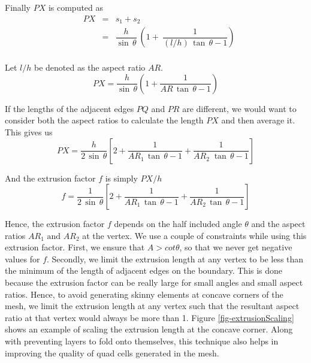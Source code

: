 Finally $\mathit{PX}$ is computed as
\begin{equation}
\begin{array}{llcl}
     &  \mathit{PX} & = & s_1 + s_2 \\
    & & = & \dfrac{h}{\sin \, \theta} \:  \left( 1 +  \: \dfrac{1}{ (l/h)\, \tan \, \theta - 1} \right)\\
\end{array}
\end{equation}

Let $l/h$ be denoted as the aspect ratio $AR$.
\begin{equation}
    \mathit{PX}  = \dfrac{h}{\sin \, \theta} \left( 1 + \dfrac{1}{AR\, \tan \, \theta - 1} \right)
\end{equation}

If the lengths of the adjacent edges $PQ$ and $PR$ are different, we would want to consider both the aspect ratios to calculate the length $PX$ and then average it. This gives us
\begin{equation}
    \mathit{PX} = \dfrac{h}{2 \, \sin\, \theta} \left[ 2 + \dfrac{1}{AR_1\, \tan \, \theta - 1} + \dfrac{1}{AR_2\; \tan \, \theta - 1} \right]
\end{equation}

And the extrusion factor $f$ is simply $PX/h$
\begin{equation}
    f = \dfrac{1}{2 \, \sin \, \theta} \left[ 2 + \dfrac{1}{AR_1\, \tan \, \theta - 1} + \dfrac{1}{AR_2\, \tan \, \theta - 1} \right]
\end{equation}

Hence, the extrusion factor $f$ depends on the half included angle $\theta$ and the aspect ratios $AR_1 \text{ and } AR_2$ at the vertex. We use a couple of constraints while using this extrusion factor. First, we ensure that $A > cot \theta$, so that we never get negative values for $f$. Secondly, we limit the extrusion length at any vertex to be less than the minimum of the length of adjacent edges on the boundary. This is done because the extrusion factor can be  really large for small angles and small aspect ratios. Hence, to avoid generating skinny elements at concave corners of the mesh, we limit the extrusion length at any vertex such that the resultant aspect ratio at that vertex would always be more than 1. Figure \ref{fig-extrusionScaling} shows an example of scaling the extrusion length at the concave corner. Along with preventing layers to fold onto themselves, this technique also helps in improving the quality of quad cells generated in the mesh.

